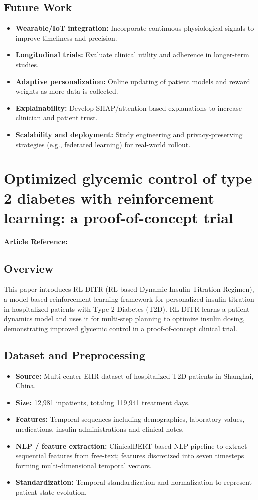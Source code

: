 \subsection*{Future Work}
\begin{itemize}
    \item \textbf{Wearable/IoT integration:} Incorporate continuous physiological signals to improve timeliness and precision.
    \item \textbf{Longitudinal trials:} Evaluate clinical utility and adherence in longer-term studies.
    \item \textbf{Adaptive personalization:} Online updating of patient models and reward weights as more data is collected.
    \item \textbf{Explainability:} Develop SHAP/attention-based explanations to increase clinician and patient trust.
    \item \textbf{Scalability and deployment:} Study engineering and privacy-preserving strategies (e.g., federated learning) for real-world rollout.
\end{itemize}
\section{Optimized glycemic control of type 2 diabetes with reinforcement learning: a proof-of-concept trial}
\textbf{Article Reference:} \cite{wangOptimizedGlycemicControl2023}
\subsection*{Overview}
This paper introduces RL-DITR (RL-based Dynamic Insulin Titration Regimen), a model-based reinforcement learning framework for personalized insulin titration in hospitalized patients with Type 2 Diabetes (T2D). RL-DITR learns a patient dynamics model and uses it for multi-step planning to optimize insulin dosing, demonstrating improved glycemic control in a proof-of-concept clinical trial.

\subsection*{Dataset and Preprocessing}
\begin{itemize}
    \item \textbf{Source:} Multi-center EHR dataset of hospitalized T2D patients in Shanghai, China.
    \item \textbf{Size:} 12{,}981 inpatients, totaling 119{,}941 treatment days.
    \item \textbf{Features:} Temporal sequences including demographics, laboratory values, medications, insulin administrations and clinical notes.
    \item \textbf{NLP / feature extraction:} ClinicalBERT-based NLP pipeline to extract sequential features from free-text; features discretized into seven timesteps forming multi-dimensional temporal vectors.
    \item \textbf{Standardization:} Temporal standardization and normalization to represent patient state evolution.
\end{itemize}

